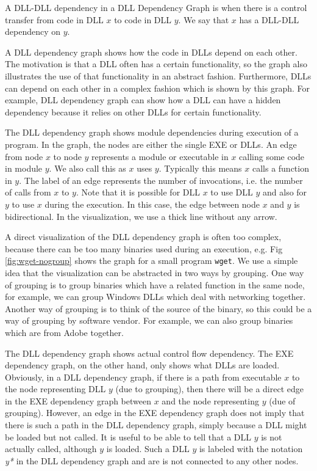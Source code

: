 \begin{definition}
A DLL-DLL dependency in a DLL Dependency Graph
is when there is a control transfer from code in 
DLL $x$ to code in DLL $y$. 
We say that $x$ has a DLL-DLL dependency on $y$.
\end{definition}

A DLL dependency graph shows how the code in DLLs depend
on each other. The motivation is that a DLL often has a certain functionality,
so the graph also illustrates the use of that functionality in an
abstract fashion. Furthermore, DLLs can depend on each other in a complex
fashion which is shown by this graph. 
For example, DLL dependency graph can show how a DLL can have
a hidden dependency because it relies on other DLLs for certain functionality.

The DLL dependency graph shows module dependencies during execution
of a program.
In the graph, the nodes are either the single EXE or DLLs.
An edge from node $x$ to node $y$ represents a module or executable
in $x$ calling some code in module $y$.
We also call this as $x$ uses $y$.
Typically this means $x$ calls a function in $y$.
The label of an edge represents the number of invocations, i.e.
the number of calls from $x$ to $y$.
Note that it is possible for DLL $x$ to use DLL $y$ and also for
$y$ to use $x$ during the execution.
In this case, the edge between node $x$ and $y$ is bidirectional.
In the visualization, we use a thick line without any arrow.

A direct visualization of the DLL dependency graph is often too complex,
because there can be too many binaries used during an execution,
e.g. Fig \ref{fig:wget-nogroup} shows the graph for a small program {\tt wget}.
We use a simple idea that the visualization can be abstracted in two ways
by grouping.
One way of grouping is to group binaries which have a related function
in the same node, for example, we can group Windows DLLs which deal with 
networking together.
Another way of grouping is to think of the source of the binary, so this
could be a way of grouping by software vendor.
For example, we can also group binaries which are from Adobe together.

The DLL dependency graph shows actual control flow dependency.
The EXE dependency graph, on the other hand, only shows what
DLLs are loaded. Obviously, in a DLL dependency graph,
if there is a path from executable $x$ to the node representing
DLL $y$ (due to grouping), then there will 
be a direct edge in the EXE dependency graph between $x$ and the node
representing $y$ (due of grouping).
However, an edge in the EXE dependency graph does not imply that there is
such a path in the DLL dependency graph, simply because a DLL might
be loaded but not called.
It is useful to be able to tell that a DLL $y$ is not actually called,
although $y$ is loaded.
Such a DLL $y$ is labeled with the notation {\it *y*} in the DLL dependency
graph and are is not connected to any other nodes.

